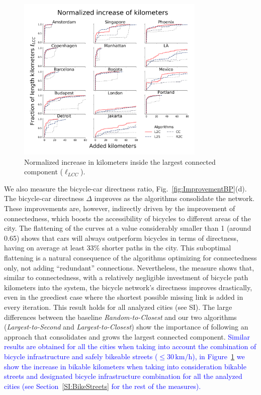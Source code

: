 \begin{figure}[ht!]
  \centering
  \includegraphics[width=0.8\textwidth]{images/datadriven/SI_Lengths_Bike_Streets.png}
  \caption{Normalized increase in kilometers inside the largest connected component ($\ell_{LCC}$).}
  \label{fig:Lengthsncrease_BikeStreets}
\end{figure}

We also measure the bicycle-car directness ratio, Fig.~\ref{fig:ImprovementBP}(d). The bicycle-car directness $\Delta$ improves as the algorithms consolidate the network. These improvements are, however, indirectly driven by the improvement of connectedness, which boosts the accessibility of bicycles to different areas of the city. The flattening of the curves at a value considerably smaller than 1 (around 0.65) shows that cars will always outperform bicycles in terms of directness, having on average at least 33\% shorter paths in the city. This suboptimal flattening is a natural consequence of the algorithms optimizing for connectedness only, not adding ``redundant'' connections. Nevertheless, the measure shows that, similar to connectedness, with a relatively negligible investment of bicycle path kilometers into the system, the bicycle network's directness improves drastically, even in the greediest case where the shortest possible missing link is added in every iteration. This result holds for all analyzed cities (see SI). The large differences between the baseline \emph{Random-to-Closest} and our two algorithms (\emph{Largest-to-Second} and \emph{Largest-to-Closest}) show the importance of following an approach that consolidates and grows the largest connected component. \textcolor{blue}{Similar results are obtained for all the cities when taking into account the combination of bicycle infrastructure and safely bikeable streets ($\leq 30\,\mathrm{km/h}$), in Figure~\ref{fig:Lengthsncrease_BikeStreets} we show the increase in bikable kilometers when taking into consideration bikable streets and designated bicycle infrastructure combination for all the analyzed cities (see Section~\ref{SI:BikeStreets} for the rest of the measures).}

